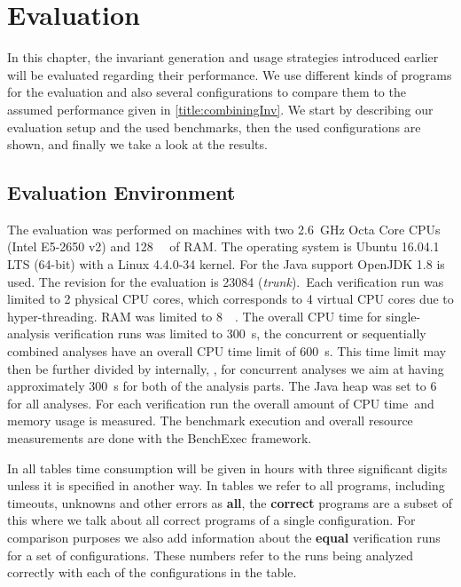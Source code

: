 \chapter{Evaluation}
In this chapter, the invariant generation and usage strategies introduced earlier will be evaluated regarding their performance. We use different kinds of programs for the evaluation and also
several configurations to compare them to the assumed performance given in \autoref{title:combiningInv}.
We start by describing our evaluation setup and the used benchmarks, then the used \CPAchecker{} configurations are shown, and finally we take a look at the results.

\section{Evaluation Environment}
The evaluation was performed on machines with two \SI{2.6}{\giga\hertz} Octa Core CPUs (Intel E5-2650 v2) and \SI{128}{\giga\byte} of RAM.
The operating system is Ubuntu 16.04.1 LTS (64-bit) with a Linux 4.4.0-34 kernel. For the Java support OpenJDK 1.8 is used.
The \CPAchecker{} revision for the evaluation is \num{23084} (\emph{trunk}).\, Each verification run was 
limited to 2 physical CPU cores, which corresponds to 4 virtual CPU cores due to hyper-threading. RAM was limited to \SI{8}{\giga\byte}.
The overall CPU time for single-analysis verification runs was limited to \SI{300}{\second},
the concurrent or sequentially combined analyses have an overall CPU time limit of \SI{600}{\second}. This time limit may then be further divided by 
\CPAchecker{} internally, \eg, for concurrent analyses we aim at having approximately \SI{300}{\second} for both of the analysis parts. 
The Java heap was set to \SI{6}{\giga\byte} for all analyses. For each verification run the overall amount of CPU time\, and memory usage is measured. The benchmark execution and overall resource measurements are done with the BenchExec
framework.\,

In all tables time consumption will be given in hours with three significant digits unless it is specified in another way.
In tables we refer to all programs, including timeouts, unknowns and other errors as \textbf{all}, the \textbf{correct} programs are a subset of this where we talk about all correct programs of a single 
configuration. For comparison purposes we also add information about the \textbf{equal} verification runs for a set of configurations. These numbers refer to the runs being analyzed correctly with each of 
the configurations in the table.


